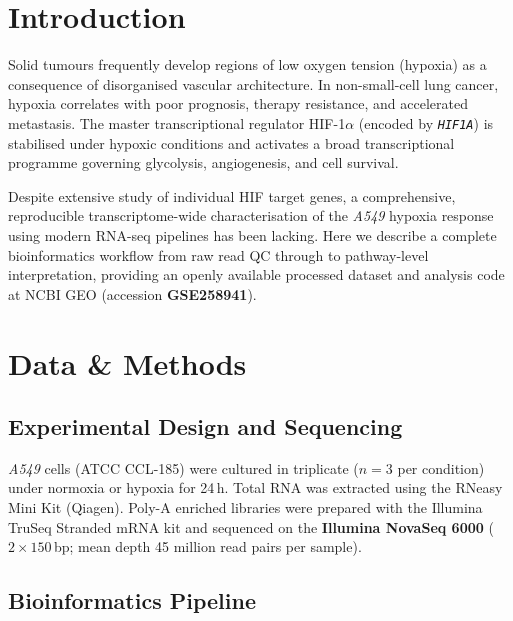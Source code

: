 \documentclass[11pt, a4paper]{article}
\newcommand{\gene}[1]{\texttt{\textit{#1}}}
\begin{document}
\section{Introduction}

Solid tumours frequently develop regions of low oxygen tension (hypoxia) as a consequence
of disorganised vascular architecture. In non-small-cell lung cancer,
hypoxia correlates with poor prognosis, therapy resistance, and accelerated metastasis.
The master transcriptional regulator HIF-1$\alpha$ (encoded by \gene{HIF1A}) is
stabilised under hypoxic conditions and activates a broad transcriptional programme
governing glycolysis, angiogenesis, and cell survival.

Despite extensive study of individual HIF target genes, a comprehensive, reproducible
transcriptome-wide characterisation of the \textit{A549} hypoxia response using modern
RNA-seq pipelines has been lacking. Here we describe a complete bioinformatics workflow
from raw read QC through to pathway-level interpretation, providing an openly available
processed dataset and analysis code at NCBI GEO (accession \textbf{GSE258941}).

\section{Data \& Methods}

\subsection{Experimental Design and Sequencing}

\textit{A549} cells (ATCC CCL-185) were cultured in triplicate ($n=3$ per condition)
under normoxia or hypoxia for 24\,h. Total RNA was extracted using the RNeasy Mini Kit
(Qiagen). Poly-A enriched libraries were prepared with the Illumina TruSeq Stranded
mRNA kit and sequenced on the \textbf{Illumina NovaSeq 6000} ($2\times150$\,bp;
mean depth 45 million read pairs per sample).

\subsection{Bioinformatics Pipeline}
\end{document}
